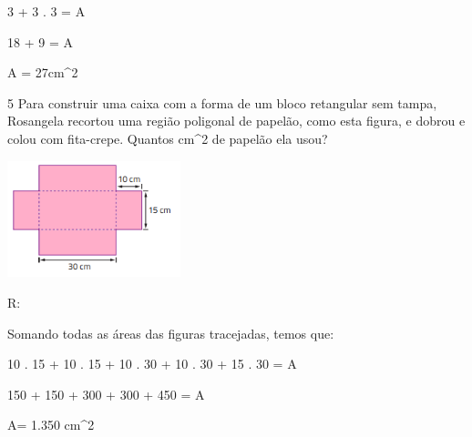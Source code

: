 {3 + 3 . 3 = A

18 + 9 = A

A = 27cm^2

\num{5} Para construir uma caixa com a forma de um bloco retangular sem
tampa, Rosangela recortou uma região poligonal de papelão, como esta
figura, e dobrou e colou com fita-crepe. Quantos cm^2 de papelão ela
usou?

\includegraphics[width=1.98333in,height=1.33255in]{./imgSAEB_8_MAT/media/image45.png}

R:

Somando todas as áreas das figuras tracejadas, temos que:

10 . 15 + 10 . 15 + 10 . 30 + 10 . 30 + 15 . 30 = A

150 + 150 + 300 + 300 + 450 = A

A= 1.350 cm^2

}
